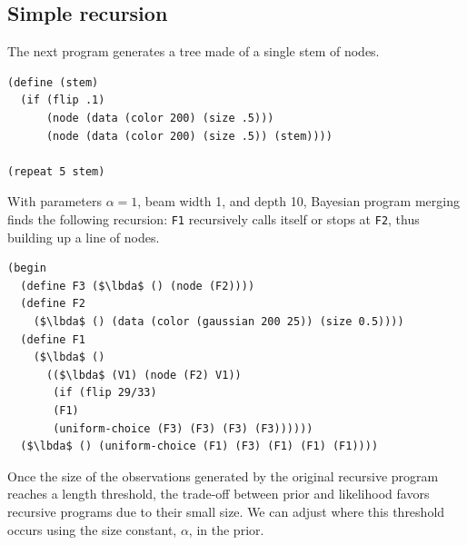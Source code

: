 \documentclass[a4paper,10pt]{article}
\newcommand{\lbda}{\color[rgb]{0,.3,.7} \lambda}
\begin{document}
\subsection{Simple recursion}
The next program generates a tree made of a single stem of nodes.
\begin{lstlisting}[mathescape=true]
(define (stem)
  (if (flip .1)
      (node (data (color 200) (size .5)))
      (node (data (color 200) (size .5)) (stem))))

(repeat 5 stem)
\end{lstlisting}
With parameters $\alpha=1$, beam width 1, and depth 10, Bayesian program merging finds the following recursion: \texttt{F1} recursively calls itself or stops at \texttt{F2}, thus building up a line of nodes.
\begin{lstlisting}[mathescape=true]
(begin
  (define F3 ($\lbda$ () (node (F2))))
  (define F2
    ($\lbda$ () (data (color (gaussian 200 25)) (size 0.5))))
  (define F1
    ($\lbda$ ()
      (($\lbda$ (V1) (node (F2) V1))
       (if (flip 29/33)
	   (F1)
	   (uniform-choice (F3) (F3) (F3) (F3))))))
  ($\lbda$ () (uniform-choice (F1) (F3) (F1) (F1) (F1))))
\end{lstlisting}
Once the size of the observations generated by the original recursive program reaches a length threshold, the trade-off between prior and likelihood favors recursive programs due to their small size. We can adjust where this threshold occurs using the size constant, $\alpha$, in the prior. 
\end{document}
